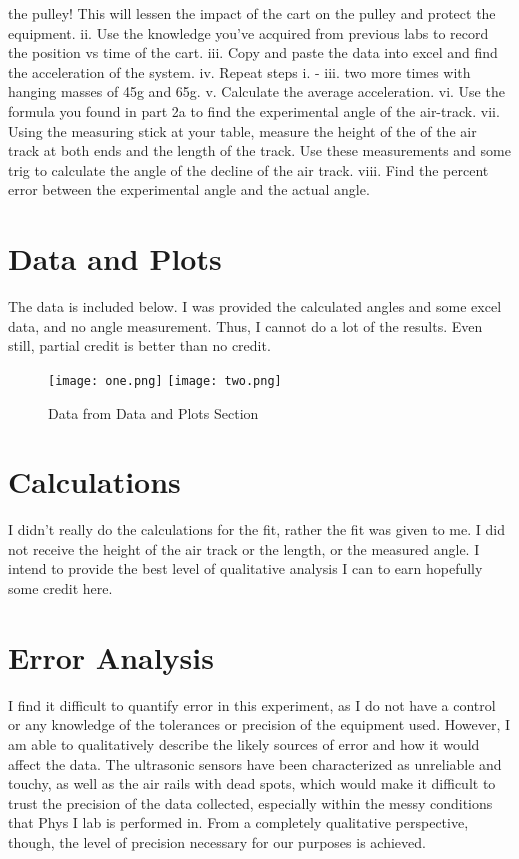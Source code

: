 \documentclass[hidelinks, 12pt, letterpaper]{article}
\begin{document}
the pulley! This will lessen the impact of the cart on the pulley and protect the
equipment.
ii. Use the knowledge you’ve acquired from previous labs to record the position vs
time of the cart.
iii. Copy and paste the data into excel and find the acceleration of the system.
iv. Repeat steps i. - iii. two more times with hanging masses of 45g and 65g.
v. Calculate the average acceleration.
vi. Use the formula you found in part 2a to find the experimental angle of the air-track.
vii. Using the measuring stick at your table, measure the height of the of the air track
at both ends and the length of the track. Use these measurements and some trig
to calculate the angle of the decline of the air track.
viii. Find the percent error between the experimental angle and the actual angle.

\section{Data and Plots}
The data is included below. I was provided the calculated angles and some
excel data, and no angle measurement. Thus, I cannot do a lot of the
results. Even still, partial credit is better than no credit.
\begin{figure}[h]
\texttt{[image: one.png]}
\texttt{[image: two.png]}
\caption{Data from Data and Plots Section}
\end{figure}

\section{Calculations}


I didn't really do the calculations for the fit, rather the fit was given to me.
I did not receive the height of the air track or the length, or the measured angle.
I intend to provide the best level of qualitative analysis I can to earn hopefully
some credit here.


\section{Error Analysis}
I find it difficult to quantify error in this experiment, as I do not have
a control or any knowledge of the tolerances or precision of the equipment used.
However, I am able to qualitatively describe the likely sources of error and 
how it would affect the data.
The ultrasonic sensors have been characterized as unreliable and touchy,
as well as the air rails with dead spots,
which would make it difficult to trust the precision of the data collected,
especially within the messy conditions that Phys I lab is performed in.
From a completely qualitative perspective, though,
the level of precision necessary for our purposes is achieved.
\end{document}
